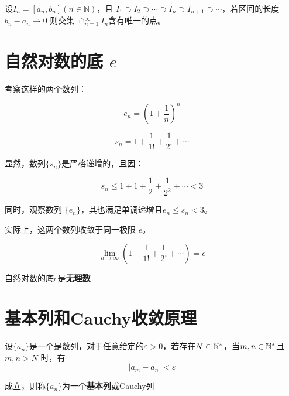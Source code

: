 
\begin{theorem}[闭区间套定理]
设\(I_n=[ a _ n, b _ n ] ( n\in \mathbb N )\)，且
\(I_1\supset I_2\supset \cdots \supset I_n\supset I_{n+1} \supset\cdots\)，若区间的长度\(b_n-a_n\rightarrow 0\)
则交集 \(\cap_{n=1}^\infty I_n\)含有唯一的点。
\end{theorem}


\section{自然对数的底 $e$}

考察这样的两个数列：

$$
e_n = \left(1+\frac 1 n\right)^n
$$

$$
s_n=1+\frac{1}{1!}+\frac{1}{2!}+\cdots
$$

显然，数列$\{s_n\}$是严格递增的，且因：

$$
s_n\le 1 + 1 + \frac{1}{2} + \frac{1}{2^2} + \cdots < 3
$$

同时，观察数列 $\{e_n\}$，其也满足单调递增且$e_n\le s_n <3$。

实际上，这两个数列收敛于同一极限 $e$。

\begin{definition}[自然对数的底 $e$]
	\[\lim_{n\rightarrow \infty}\left(1+\frac{1}{1!} + \frac{1}{2!}+\cdots\right)=e\]
\end{definition}

\begin{theorem}
	自然对数的底$e$是\textbf{无理数}
\end{theorem}



\section{基本列和Cauchy收敛原理}

\begin{definition}[基本列]
	设$\{a_n\}$是一个是数列，对于任意给定的$\varepsilon > 0$，若存在$N\in\mathbb{N}^*$，当$m,n\in \mathbb{N}^*$且 $m,n>N$ 时，有
	\[
		|a_m - a_n| < \varepsilon
	\]
	
\noindent 成立，则称$\{a_n\}$为一个\textbf{基本列}或\textnormal{Cauchy}列
\end{definition}

